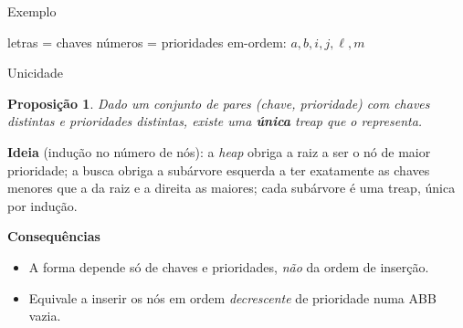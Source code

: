 \documentclass[aspectratio=169,11pt]{beamer}
\newtheorem{proposicao}[theorem]{Proposição}
\theoremstyle{definition}
\begin{document}
\begin{frame}{Exemplo}
  \centering

  \small letras = chaves \quad números = prioridades \quad
  em-ordem: $a,b,i,j,\ell,m$
\end{frame}

\begin{frame}{Unicidade}
  \begin{proposicao}
    Dado um conjunto de pares (chave, prioridade) com chaves distintas
    e prioridades distintas, existe uma \textbf{única} treap que o
    representa.
  \end{proposicao}
  \pause
  \textbf{Ideia} (indução no número de nós): a \emph{heap} obriga a
  raiz a ser o nó de maior prioridade; a busca obriga a subárvore
  esquerda a ter exatamente as chaves menores que a da raiz e a direita
  as maiores; cada subárvore é uma treap, única por indução.
  \pause
  \medskip

  \textbf{Consequências}
  \begin{itemize}
  \item A forma depende só de chaves e prioridades, \emph{não} da
    ordem de inserção.
  \item Equivale a inserir os nós em ordem \emph{decrescente} de
    prioridade numa ABB vazia.
  \end{itemize}
\end{frame}
\end{document}
